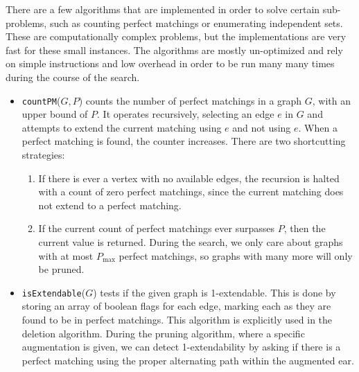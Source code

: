 \documentclass[11pt]{article}
\begin{document}
There are a few algorithms that are implemented in order 
	to solve certain sub-problems, such as counting perfect matchings
	or enumerating independent sets.
These are computationally complex problems, but 
	the implementations are very fast for these small instances.
The algorithms are mostly un-optimized and rely on simple instructions and 
	low overhead in order to be run many many times during the course
	of the search.
	
\begin{itemize}
	\item \texttt{countPM}($G,P$) counts the number of perfect matchings in a graph $G$,
		with an upper bound of $P$.
		It operates recursively, selecting an edge $e$ in $G$ and 
			attempts to extend the current matching using $e$ and not using $e$.
		When a perfect matching is found, the counter increases.
		There are two shortcutting strategies:
		
		\begin{enumerate}
			\item If there is ever a vertex with no available edges, 
				the recursion is halted with a count of zero perfect matchings,
				since the current matching does not extend to a perfect matching.
				
			\item If the current count of perfect matchings ever surpasses $P$,
				then the current value is returned.
				During the search, we only care about graphs with at most $P_{\max}$
					perfect matchings, so graphs with many more
					will only be pruned.
		\end{enumerate} 
		
	\item \texttt{isExtendable}($G$) tests if the given graph is 1-extendable.
		This is done by storing an array of boolean flags for each edge, marking 
			each as they are found to be in perfect matchings.
		This algorithm is explicitly used in the deletion algorithm.
		During the pruning algorithm, where a specific augmentation is given, 
			we can detect 1-extendability by 
			asking if there is a perfect matching using the 
			proper alternating path within the augmented ear.
	

\end{itemize}
\end{document}
